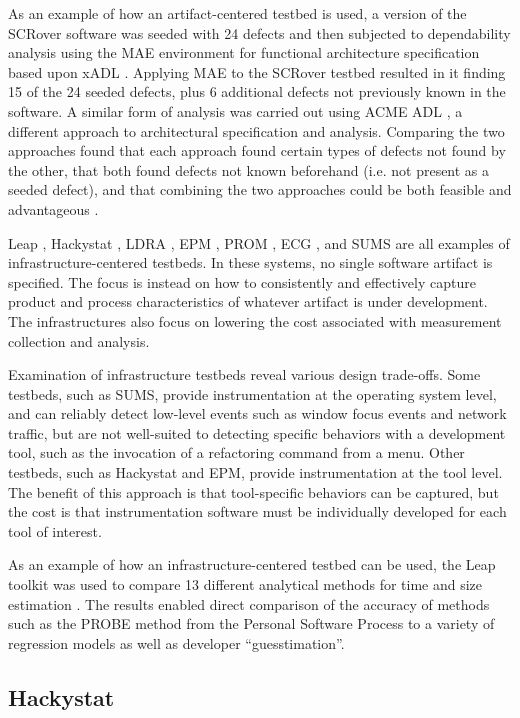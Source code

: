 As an example of how an artifact-centered testbed is used, a version of the
SCRover software was seeded with 24 defects and then subjected to
dependability analysis using the MAE environment for functional
architecture specification based upon xADL \cite{Dashofy02}.  Applying MAE
to the SCRover testbed resulted in it finding 15 of the 24 seeded defects,
plus 6 additional defects not previously known in the software.  A similar
form of analysis was carried out using ACME ADL \cite{Garlan00}, a
different approach to architectural specification and analysis.  Comparing
the two approaches found that each approach found certain types of defects
not found by the other, that both found defects not known beforehand
(i.e. not present as a seeded defect), and that combining the two
approaches could be both feasible and advantageous \cite{Boehm04b}.

Leap \cite{csdl2-00-03}, Hackystat \cite{Hackystat}, LDRA \cite{Hennel06},
EPM \cite{EPM}, PROM \cite{PROM}, ECG \cite{ECG}, and SUMS \cite{SUMS} are
all examples of infrastructure-centered testbeds.  In these systems, no
single software artifact is specified.  The focus is instead on how to
consistently and effectively capture product and process characteristics of
whatever artifact is under development.  The infrastructures also focus on
lowering the cost associated with measurement collection and analysis.

Examination of infrastructure testbeds reveal various design trade-offs.
Some testbeds, such as SUMS, provide instrumentation at the operating
system level, and can reliably detect low-level events such as window focus
events and network traffic, but are not well-suited to detecting specific
behaviors with a development tool, such as the invocation of a refactoring
command from a menu.  Other testbeds, such as Hackystat and EPM, provide
instrumentation at the tool level.  The benefit of this approach is that
tool-specific behaviors can be captured, but the cost is that
instrumentation software must be individually developed for each tool of
interest.

As an example of how an infrastructure-centered testbed can be used, the
Leap toolkit was used to compare 13 different analytical methods for time
and size estimation \cite{csdl2-00-03}.  The results enabled direct
comparison of the accuracy of methods such as the PROBE method from the
Personal Software Process to a variety of regression models as well as
developer ``guesstimation''.

\subsection{Hackystat}
\label{sec:hackystat}

